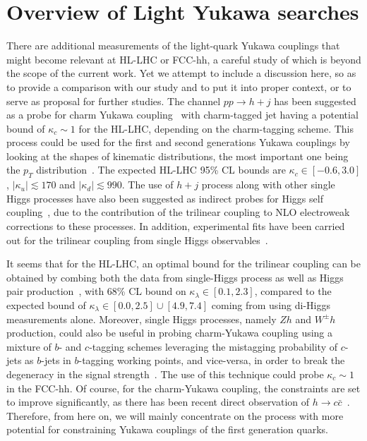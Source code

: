\section{Overview of Light Yukawa searches \label{sec:comparetoothers}}
There are additional measurements of the light-quark Yukawa couplings that might become relevant at HL-LHC or FCC-hh, a careful study of which is beyond the scope of the current work. Yet we attempt to include a discussion here, so as to provide a comparison with our study and to put it into proper context, or to serve as proposal for further studies.
The channel $pp \to h +j $ has been suggested as a probe for charm Yukawa coupling~\cite{Brivio:2015fxa} with charm-tagged jet having a potential bound of $\kappa_c\sim 1$ for the HL-LHC, depending on the charm-tagging scheme. This process could be used for the first and second generations Yukawa couplings by looking at the shapes of kinematic distributions, the most important one being the $p_T$ distribution~\cite{Soreq:2016rae,Bishara:2016jga, Bonner:2016sdg}. The expected HL-LHC 95\% CL bounds are $\kappa_c \in [-0.6,3.0]$, $|\kappa_u |\lesssim 170 $ and $|\kappa_d| \lesssim 990$. The use of $h+j$ process along with other single Higgs processes have also been suggested as indirect probes for Higgs self coupling~\cite{McCullough:2013rea,Gorbahn:2016uoy,Bizon:2016wgr,Degrassi:2016wml,Maltoni:2017ims,Degrassi:2021uik}, due to the contribution of the trilinear coupling to NLO electroweak corrections to these processes. In addition, experimental fits have been carried out for the trilinear coupling from single Higgs observables~\cite{CMS:2018rig,ATLAS:2019pbo}. 

It seems that for the HL-LHC, an optimal bound for the trilinear coupling can be obtained by combing both the data from single-Higgs process as well as Higgs pair production~\cite{DiVita:2017eyz}, with 68\% CL bound on $\kappa_\lambda \in[0.1,2.3]$, compared to the expected bound of $\kappa_\lambda \in [0.0,2.5] \cup [4.9,7.4]$ coming from using di-Higgs measurements alone. Moreover, single Higgs processes, namely $Zh$ and $ W^\pm h$ production, could also be useful in probing charm-Yukawa coupling using a mixture of $b$- and $c$-tagging schemes leveraging the mistagging probability of $c$-jets as $b$-jets in $b$-tagging working points, and vice-versa, in order to break the degeneracy in the signal strength~\cite{Perez:2015lra}. The use of this technique could probe $\kappa_c \sim 1$ in the FCC-hh. Of course, for the charm-Yukawa coupling, the constraints are set to improve significantly, as there has been recent direct observation of $h\to c \bar c$~\cite{ATLAS-CONF-2021-021}. Therefore, from here on, we will mainly concentrate  on the process with more potential for constraining Yukawa couplings of the first generation quarks. 

